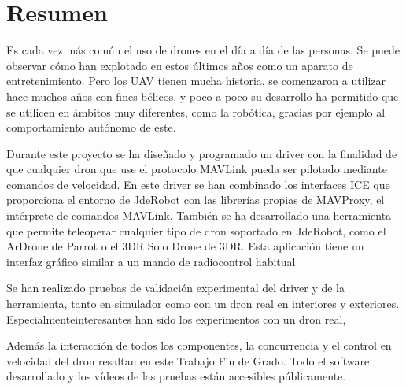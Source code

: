 \chapter*{Resumen}

\hspace{1cm} Es cada vez más común el uso de drones en el día a día de las personas. Se puede observar cómo han explotado en estos últimos años como un aparato de entretenimiento. Pero los UAV tienen mucha historia, se comenzaron a utilizar hace muchos años con fines bélicos, y poco a poco su desarrollo ha permitido que se utilicen en ámbitos muy diferentes, como la robótica, gracias por ejemplo al comportamiento autónomo de este.

\hspace{1cm} Durante este proyecto se ha diseñado y programado un driver con la finalidad de que cualquier dron que use el protocolo MAVLink pueda ser pilotado mediante comandos de velocidad. En este driver se han combinado los interfaces ICE que proporciona el entorno de JdeRobot con las librerías propias de MAVProxy, el intérprete de comandos MAVLink. También se ha desarrollado una herramienta que permite teleoperar cualquier tipo de dron soportado en JdeRobot, como el ArDrone de Parrot o el 3DR Solo Drone de 3DR. Esta aplicación tiene un interfaz gráfico similar a un mando de radiocontrol habitual 

\hspace{1cm} Se han realizado pruebas de validación experimental del driver y de la herramienta, tanto en simulador como con un dron real en interiores y exteriores. Especialmenteinteresantes han sido los experimentos con un dron real, 

\hspace{1cm} Además la interacción de todos los componentes, la concurrencia y el control en velocidad del dron resaltan en este Trabajo Fin de Grado. Todo el software desarrollado y los vídeos de las pruebas están accesibles p\'ublicamente. 

